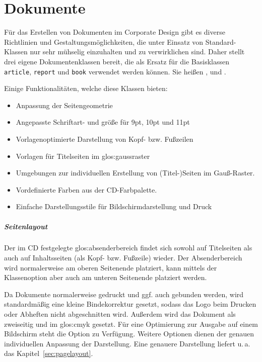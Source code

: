 \chapter{Dokumente}

Für das Erstellen von Dokumenten im Corporate Design gibt es diverse Richtlinien
und Gestaltungsmöglichkeiten, die unter Einsatz von Standard-Klassen nur sehr
mühselig einzuhalten und zu verwirklichen sind.
Daher stellt \tubslatex drei eigene Dokumentenklassen bereit, die als Ersatz für
die Basisklassen \lstinline{article}, \lstinline{report} und \lstinline{book} 
verwendet werden können. Sie heißen ,
 und .

Einige Funktionalitäten, welche diese Klassen bieten:
\begin{itemize}
  \item Anpassung der Seitengeometrie
  \item Angepasste Schriftart- und größe für 9pt, 10pt und 11pt
  \item Vorlagenoptimierte Darstellung von Kopf- bzw. Fußzeilen
  \item Vorlagen für Titelseiten im \gls{glos:gaussraster}
  \item Umgebungen zur individuellen Erstellung von (Titel-)Seiten im Gauß-Raster.
  \item Vordefinierte Farben aus der \acs{CD}-Farbpalette.
  \item Einfache Darstellungsstile für Bildschirmdarstellung und Druck
\end{itemize}

\paragraph{Seitenlayout}

Der im \acs{CD} festgelegte \gls{glos:absenderbereich} findet sich sowohl auf
Titelseiten als auch auf Inhaltsseiten (als Kopf- bzw. Fußzeile) wieder.
Der Absenderbereich wird normalerweise am oberen Seitenende platziert,
kann mittels der Klassenoption  aber auch am unteren
Seitenende platziert werden.

Da Dokumente normalerweise gedruckt und ggf. auch gebunden werden,
wird standardmäßig eine kleine Bindekorrektur gesetzt, sodass das
Logo beim Drucken oder Abheften nicht abgeschnitten wird.
Außerdem wird das Dokument als zweiseitig und im \gls{glos:cmyk} gesetzt.
Für eine Optimierung zur Ausgabe auf einem Bildschirm steht die Option
 zu Verfügung. Weitere Optionen dienen der
genauen individuellen Anpassung der Darstellung. Eine genauere Darstellung
liefert \mbox{u.\,a.}\xspace das Kapitel~\ref{sec:pagelayout}.

